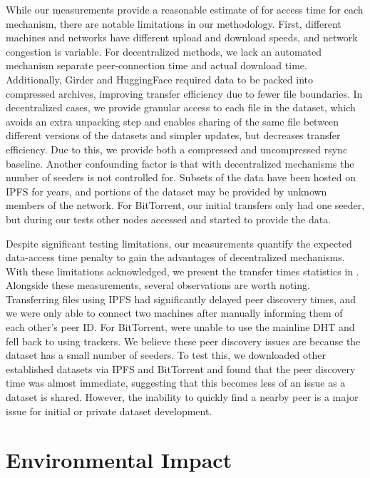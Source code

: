 While our measurements provide a reasonable estimate of for access time for each mechanism, there are
  notable limitations in our methodology.
First, different machines and networks have different upload and download speeds, and network congestion is
  variable.
For decentralized methods, we lack an automated mechanism separate peer-connection time and actual download
  time.
Additionally, Girder and HuggingFace required data to be packed into compressed archives, improving transfer
  efficiency due to fewer file boundaries.
In decentralized cases, we provide granular access to each file in the dataset, which avoids an extra
  unpacking step and enables sharing of the same file between different versions of the datasets and simpler
  updates, but decreases transfer efficiency.
Due to this, we provide both a compressed and uncompressed rsync baseline.
Another confounding factor is that with decentralized mechanisms the number of seeders is not controlled
  for.
Subsets of the data have been hosted on IPFS for years, and portions of the dataset may be provided by
  unknown members of the network.
For BitTorrent, our initial transfers only had one seeder, but during our tests other nodes accessed and
  started to provide the data.

Despite significant testing limitations, our measurements quantify the expected data-access time penalty to
  gain the advantages of decentralized mechanisms.
With these limitations acknowledged, we present the transfer times statistics in .
Alongside these measurements, several observations are worth noting.
Transferring files using IPFS had significantly delayed peer discovery times, and we were only able to
  connect two machines after manually informing them of each other's peer ID.
For BitTorrent, were unable to use the mainline DHT and fell back to using trackers.
We believe these peer discovery issues are because the dataset has a small number of seeders.
To test this, we downloaded other established datasets via IPFS and BitTorrent and found that the peer
  discovery time was almost immediate, suggesting that this becomes less of an issue as a dataset is shared.
However, the inability to quickly find a nearby peer is a major issue for initial or private dataset
  development.


\section{Environmental Impact} 
\label{sec:environmental_impact}

